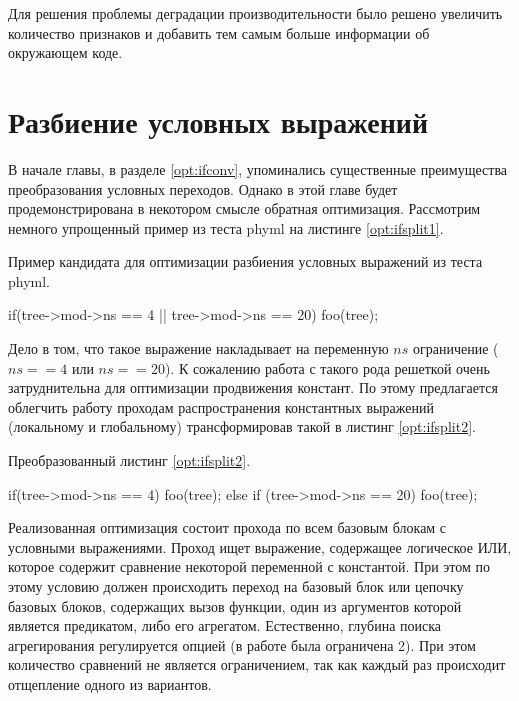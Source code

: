 Для решения проблемы деградации производительности было решено увеличить количество признаков и добавить тем самым больше информации об окружающем коде. 

\section{Разбиение условных выражений}  \label{ifsplit}
В начале главы, в разделе \ref{opt:ifconv}, упоминались существенные преимущества преобразования условных переходов. Однако в этой главе будет продемонстрирована в некотором смысле обратная оптимизация. Рассмотрим немного упрощенный пример из теста phyml на листинге \ref{opt:ifsplit1}.
\begin{ListingEnv}[!h]
	\captiondelim{ } %
	\caption{Пример кандидата для оптимизации разбиения условных выражений из теста phyml.}\label{opt:ifsplit1}
	\begin{Verb}
		if(tree->mod->ns == 4 || tree->mod->ns == 20) {	
			foo(tree);
		}
	\end{Verb}
\end{ListingEnv}

Дело в том, что такое выражение накладывает на переменную $ns$ ограничение ($ns==4$ или $ns==20$). К сожалению работа с такого рода решеткой очень затруднительна для оптимизации продвижения констант. По этому предлагается облегчить работу проходам распространения константных выражений (локальному и глобальному) трансформировав такой в листинг \ref{opt:ifsplit2}.
\begin{ListingEnv}[!h]
	\captiondelim{ } %
	\caption{Преобразованный листинг \ref{opt:ifsplit2}.}\label{opt:ifsplit2}
	\begin{Verb}
		if(tree->mod->ns == 4) {	
			foo(tree);
		} else if (tree->mod->ns == 20) {
			foo(tree);
		}
	\end{Verb}
\end{ListingEnv}

Реализованная оптимизация состоит прохода по всем базовым блокам с условными выражениями.
Проход ищет выражение, содержащее логическое ИЛИ, которое содержит сравнение некоторой переменной с константой. При этом по этому условию должен происходить переход на базовый блок или цепочку базовых блоков, содержащих вызов функции,  один из аргументов которой является предикатом, либо его агрегатом. Естественно, глубина поиска агрегирования регулируется опцией (в работе была ограничена 2). При этом количество сравнений не  является ограничением, так как каждый раз происходит отщепление одного из вариантов. 

